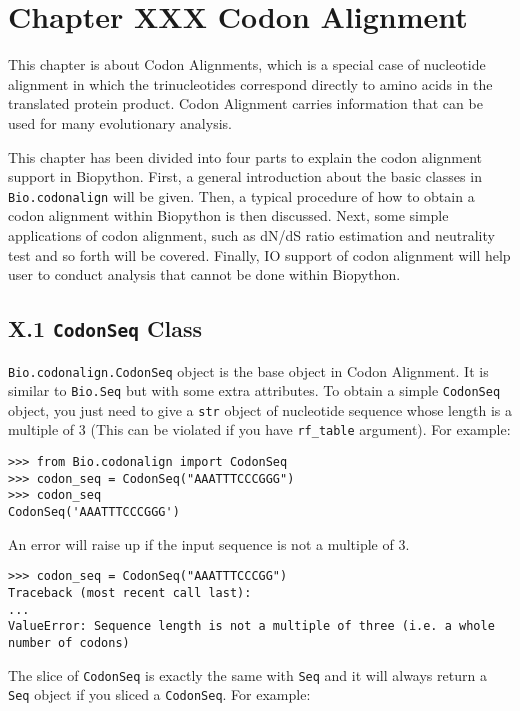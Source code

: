 \documentclass{article}
\begin{document}
\section{Chapter XXX Codon Alignment}

This chapter is about Codon Alignments, which is a special case of
nucleotide alignment in which the trinucleotides correspond directly to
amino acids in the translated protein product. Codon Alignment carries
information that can be used for many evolutionary analysis.

This chapter has been divided into four parts to explain the codon
alignment support in Biopython. First, a general introduction about the
basic classes in \texttt{Bio.codonalign} will be given. Then, a typical
procedure of how to obtain a codon alignment within Biopython is then
discussed. Next, some simple applications of codon alignment, such as
dN/dS ratio estimation and neutrality test and so forth will be covered.
Finally, IO support of codon alignment will help user to conduct
analysis that cannot be done within Biopython.

\subsection{X.1 \texttt{CodonSeq} Class}

\texttt{Bio.codonalign.CodonSeq} object is the base object in Codon
Alignment. It is similar to \texttt{Bio.Seq} but with some extra
attributes. To obtain a simple \texttt{CodonSeq} object, you just need
to give a \texttt{str} object of nucleotide sequence whose length is a
multiple of 3 (This can be violated if you have \texttt{rf\_table}
argument). For example:

\begin{verbatim}
>>> from Bio.codonalign import CodonSeq
>>> codon_seq = CodonSeq("AAATTTCCCGGG")
>>> codon_seq
CodonSeq('AAATTTCCCGGG')
\end{verbatim}

An error will raise up if the input sequence is not a multiple of 3.

\begin{verbatim}
>>> codon_seq = CodonSeq("AAATTTCCCGG")
Traceback (most recent call last):
...
ValueError: Sequence length is not a multiple of three (i.e. a whole number of codons)
\end{verbatim}


The slice of \texttt{CodonSeq} is exactly the same with \texttt{Seq} and
it will always return a \texttt{Seq} object if you sliced a
\texttt{CodonSeq}. For example:
\end{document}
